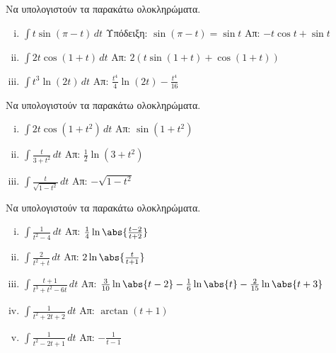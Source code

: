 \documentclass[a4paper]{report}
\begin{document}
\begin{center}
  \minibox{\large\bfseries \textcolor{Col1}{Ασκήσεις στα ολοκληρώματα}}
\end{center}

\vspace{\baselineskip}

\begin{exercise}
  Να υπολογιστούν τα παρακάτω ολοκληρώματα.

  \begin{enumerate}[i)]
    \item $ \int t \sin{(\pi - t)} \,{dt} $ 
      \quad \textcolor{Col1}{Υπόδειξη:} $ \sin{(\pi - t)} = \sin{t}$  
      \hfill Απ: $ -t \cos{t} + \sin{t} $ 
    \item $ \int 2t \cos{(1+t)} \,{dt} $
      \hfill Απ: $ 2(t \sin{(1+t)} + \cos{(1+t)}) $  
    \item $ \int t^{3} \ln{(2t)}\,{dt} $
      \hfill Απ: $ \frac{t^4}{4} \ln{(2t)} - \frac{t^4}{16} $ 
  \end{enumerate}

\end{exercise}

\begin{exercise}
  Να υπολογιστούν τα παρακάτω ολοκληρώματα.

  \begin{enumerate}[i)]
    \item $ \int 2t \cos{(1+t^2)} \,{dt} $ 
      \hfill Απ: $ \sin{(1+t^{2})}  $ 
    \item $ \int \frac{t}{3+t^{2}} \,{dt} $
      \hfill Απ: $ \frac{1}{2} \ln{(3+t^2)} $ 
    \item $ \int \frac{t}{\sqrt{1-t^{2}}} \,{dt} $
      \hfill Απ: $ - \sqrt{1-t^2} $ 
  \end{enumerate}
\end{exercise}


\begin{exercise}
  Να υπολογιστούν τα παρακάτω ολοκληρώματα.

  \begin{enumerate}[i)]
    \item $ \int \frac{1}{t^{2}-4} \,{dt} $ 
      \hfill Απ: $ \frac{1}{4} \ln{\abs{\frac{t-2}{t+2}}} $  
    \item $ \int \frac{2}{t^{2}+t} \,{dt} $ 
      \hfill Απ: $ 2\ln{\abs{\frac{t}{t+1}} } $ 
    \item $ \int \frac{t+1}{t^{3}+t^{2}-6t} \,{dt} $ 
      \hfill Απ: $ \frac{3}{10} \ln{\abs{t-2} - \frac{1}{6} 
      \ln{\abs{t} - \frac{2}{15}} \ln{\abs{t+3}}} $
    \item $ \int \frac{1}{t^{2}+2t+2} \,{dt} $
      \hfill Απ: $ \arctan{(t+1)} $  
    \item $ \int \frac{1}{t^{2}-2t+1} \,{dt} $
      \hfill Απ: $ - \frac{1}{t-1} $  
  \end{enumerate}
\end{exercise}
\end{document}
